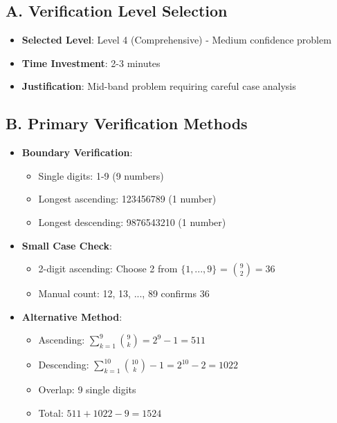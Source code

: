 \documentclass[]{article}
\begin{document}
\begin{verificationbox}
\subsection*{A. Verification Level Selection}
\begin{itemize}[leftmargin=*]
    \item \textbf{Selected Level}: Level 4 (Comprehensive) - Medium confidence problem
    \item \textbf{Time Investment}: 2-3 minutes
    \item \textbf{Justification}: Mid-band problem requiring careful case analysis
\end{itemize}

\subsection*{B. Primary Verification Methods}
\begin{itemize}[leftmargin=*]
    \item \textbf{Boundary Verification}:
    \begin{itemize}
        \item Single digits: 1-9 (9 numbers) \checkmark
        \item Longest ascending: 123456789 (1 number) \checkmark
        \item Longest descending: 9876543210 (1 number) \checkmark
    \end{itemize}
    
    \item \textbf{Small Case Check}:
    \begin{itemize}
        \item 2-digit ascending: Choose 2 from $\{1,...,9\}$ = $\binom{9}{2} = 36$
        \item Manual count: 12, 13, ..., 89 confirms 36 \checkmark
    \end{itemize}
    
    \item \textbf{Alternative Method}:
    \begin{itemize}
        \item Ascending: $\sum_{k=1}^{9} \binom{9}{k} = 2^9 - 1 = 511$ \checkmark
        \item Descending: $\sum_{k=1}^{10} \binom{10}{k} - 1 = 2^{10} - 2 = 1022$ \checkmark
        \item Overlap: 9 single digits \checkmark
        \item Total: $511 + 1022 - 9 = 1524$ \checkmark
    \end{itemize}
\end{itemize}


\end{verificationbox}
\end{document}

